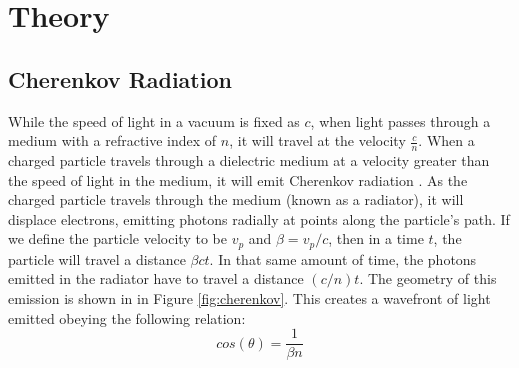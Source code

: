 
\chapter{Theory}
\label{ch:Theory}

\section{Cherenkov Radiation}
While the speed of light in a vacuum is fixed as $c$, when light passes through a medium with a refractive index of $n$, it will travel at the velocity $\frac{c}{n}$. When a charged particle travels through a dielectric medium at a velocity greater than the speed of light in the medium, it will emit Cherenkov radiation \cite{cherenkov}. As the charged particle travels through the medium (known as a radiator), it will displace electrons, emitting photons radially at points along the particle's path. If we define the particle velocity to be $v_p$ and $\beta = v_p / c$, then in a time $t$, the particle will travel a distance $\beta ct$. In that same amount of time, the photons emitted in the radiator have to travel a distance $(c/n)t$. The geometry of this emission is shown in in Figure \ref{fig:cherenkov}. This creates a wavefront of light emitted obeying the following relation:
\begin{equation}
    cos(\theta) = \frac{1}{\beta n}
    \label{eq:cherenkovAngle}
\end{equation}

